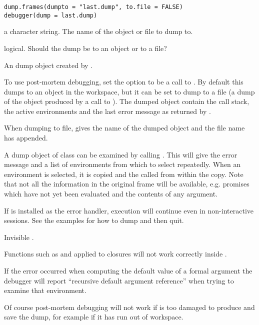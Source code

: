 %
\begin{Usage}
\begin{verbatim}
dump.frames(dumpto = "last.dump", to.file = FALSE)
debugger(dump = last.dump)
\end{verbatim}
\end{Usage}
%
\begin{Arguments}
\begin{ldescription}
\item[\code{dumpto}] a character string. The name of the object or file to
dump to.
\item[\code{to.file}] logical. Should the dump be to an \R{} object or to a
file?
\item[\code{dump}] An \R{} dump object created by .
\end{ldescription}
\end{Arguments}
%
\begin{Details}\relax
To use post-mortem debugging, set the option  to be a call
to .  By default this dumps to an \R{} object
 in the workspace, but it can be set to dump to a
file (a dump of the object produced by a call to ).
The dumped object contain the call stack, the active environments and
the last error message as returned by .

When dumping to file,  gives the name of the dumped
object and the file name has  appended.

A dump object of class  can be examined by calling
.  This will give the error message and a list of
environments from which to select repeatedly.  When an environment is
selected, it is copied and the  called from
within the copy.  Note that not all the information in the original
frame will be available, e.g. promises which have not yet been
evaluated and the contents of any  argument.

If  is installed as the error handler, execution
will continue even in non-interactive sessions.  See the examples for
how to dump and then quit.
\end{Details}
%
\begin{Value}
Invisible .
\end{Value}
%
\begin{Note}\relax
Functions such as  and
 applied to closures will not work correctly
inside .

If the error occurred when computing the default value of a formal
argument the debugger will report ``recursive default argument
reference'' when trying to examine that environment.

Of course post-mortem debugging will not work if \R{} is too damaged to
produce and save the dump, for example if it has run out of workspace.
\end{Note}
